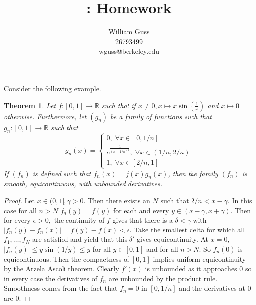 \documentclass[letter]{article}
\title{\bCLASS: Homework \bHWN}
\author{William Guss\\26793499\\wguss@berkeley.edu}
\newtheorem{theorem}{Theorem}
\newenvironment{menumerate}{%
  \edef\backupindent{\the\parindent}%
  \enumerate%
  \setlength{\parindent}{\backupindent}%
}{\endenumerate}
\begin{document}
\maketitle
\thispagestyle{empty}


\begin{menumerate}
	\setcounter{enumi}{7}
	\item %
	\item %
	\item %

	\setcounter{enumi}{12}
	\item %

	\setcounter{enumi}{17}
	\item %

	\setcounter{enumi}{21}
	\item %
	Consider the following example. 
	\begin{theorem}
		Let $f:[0,1] \to \mathbb{R}$ such that if $x \neq 0, x \mapsto x\sin\left(\frac{1}{x}\right)$ and $x\mapsto 0$ otherwise. Furthermore,
		let $(g_n)$ be a family of functions such that $g_n : [0,1] \to \mathbb{R}$ such that
		$$g_n(x) = \left\{
                \begin{array}{ll}
                  0,\;\forall x \in [0,1/n] \\
                  e^{\frac{1}{(x-1/n)^2}},\;\forall x \in (1/n,2/n)\\
                  1,\;\forall x \in [2/n,1]
                \end{array}
              \right.$$
        If $(f_n)$ is defined such that $f_n(x) = f(x)g_n(x)$, then the family $(f_n)$ is smooth, equicontinuous, with unbounded derivatives.
	\end{theorem}
	\begin{proof}
		Let $x\in (0,1], \gamma > 0.$ Then there exists an $N$ such that $2/n < x-\gamma.$
		 In this case for all $n>N$ $f_n(y) = f(y)$ for each and every $y \in (x-\gamma,x+\gamma).$
		 Then for every $\epsilon > 0,$ the continuity of $f$ gives that there is a $\delta < \gamma$ with $|f_n(y) - f_n(x)| = f(y)-f(x) < \epsilon.$
		 Take the smallest delta for which all $f_1,\dots,f_N$ are satisfied and yield that this $\delta'$ gives equicontinuity. At $x = 0$, $|f_n(y)| \leq y\sin(1/y)\leq y$ for all $y \in [0,1]$ and for all $n > N.$ So  $f_n(0)$ is equicontinuous. Then the compactness of $[0,1]$ implies uniform equicontinuity by the Arzela Ascoli theorem.
		 Clearly $f'(x)$ is unbounded as it approaches $0$ so in every case the derivatives of $f_n$ are unbounded by the product rule.
		 Smoothness comes from the fact that $f_n = 0$ in $[0,1/n]$ and the derivatives at $0$ are $0.$
	\end{proof}
\end{menumerate}	
\end{document}
